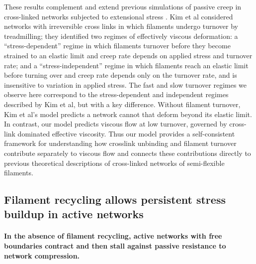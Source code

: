 \documentclass[10pt,letterpaper]{article}
\begin{document}
These results complement and extend previous simulations of passive creep in cross-linked networks subjected to extensional stress  \cite{Kim2014526}.  Kim et al considered networks with irreversible cross links in which filaments undergo turnover by treadmilling; they identified two regimes of effectively viscous deformation: a ``stress-dependent'' regime in which filaments turnover before they become strained to an elastic limit and creep rate depends on applied stress and turnover rate; and a ``stress-independent'' regime in which filaments reach an elastic limit before turning over and creep rate depends only on the turnover rate, and is insensitive to variation in applied stress. The fast and slow turnover regimes we observe here correspond to the stress-dependent and independent regimes described by Kim et al, but with a key difference. Without filament turnover, Kim et al's model predicts a network cannot that deform beyond its elastic limit.  In contrast, our model predicts viscous flow at low turnover, governed by cross-link dominated effective viscosity.   Thus our model provides a self-consistent framework for understanding how crosslink unbinding and filament turnover contribute separately to viscous flow and connects these contributions directly to previous theoretical descriptions of cross-linked networks of semi-flexible filaments.






\subsection*{Filament recycling allows persistent stress buildup in active networks}

\paragraph{In the absence of filament recycling, active networks with free boundaries contract and then stall against passive resistance to network compression.}
\end{document}
